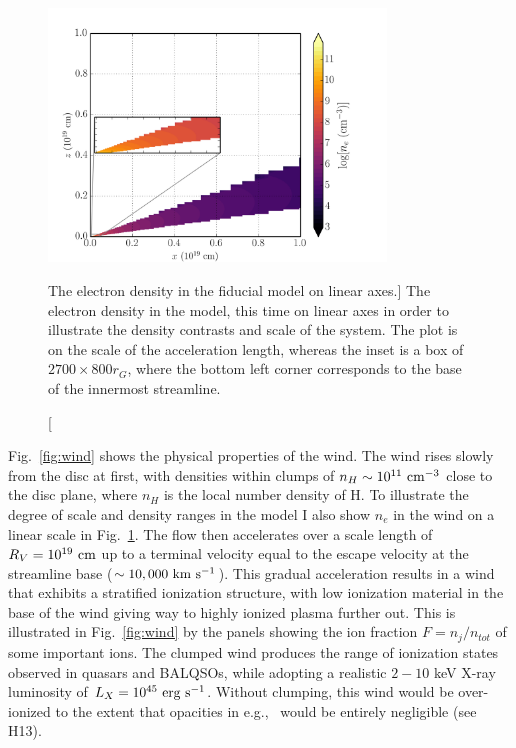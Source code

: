 \begin{figure} 
\centering
\includegraphics[width=0.8\textwidth]{figures/06-agnpaper/ne_in_wind.png}
\caption
[The electron density in the fiducial model on linear axes.]
{
The electron density in the model, this time on linear axes
in order to illustrate the density contrasts and scale of the system.
The plot is on the scale of the acceleration length, whereas
the inset is a box of $2700 \times 800 r_G$, where the bottom left corner
corresponds to the base of the innermost streamline.
}
\label{fig:ne_in_wind}
\end{figure} 

\noindent
Fig.~\ref{fig:wind} shows the physical properties of the wind.
The wind rises slowly from the disc at first, with densities within clumps
of $n_H \sim 10^{11}~\rm{cm^{-3}}$ close to the disc plane, 
where $n_H$ is the local number density of H. To illustrate the degree
of scale and density ranges in the model I also show $n_e$ in the wind
on a linear scale in Fig.~\ref{fig:ne_in_wind}.
The flow then accelerates over a scale length of $R_V=10^{19}~\rm{cm}$
up to a terminal velocity equal to the escape velocity at the streamline base
($\sim10,000~\rm{km~s^{-1}}$). This gradual acceleration results in
a wind that exhibits a stratified ionization structure, with low ionization material
in the base of the wind giving way to highly ionized plasma further out.
This is illustrated in Fig.~\ref{fig:wind} 
by the panels showing the ion fraction $F=n_j/n_{tot}$ of some important ions.
The clumped wind produces the range of ionization states observed
in quasars and BALQSOs, while adopting a realistic $2-10$ keV X-ray luminosity
of $L_{X}=10^{45}~\rm{erg~s^{-1}}$. Without clumping, this wind would be over-ionized 
to the extent that opacities in e.g., \civ\ would be entirely negligible (see H13).

